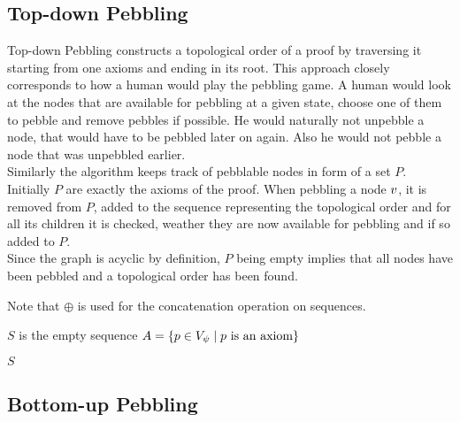 \documentclass{llncs}
\begin{document}
\subsection{Top-down Pebbling}

Top-down Pebbling constructs a topological order of a proof by traversing it starting from one axioms and ending in its root.
This approach closely corresponds to how a human would play the pebbling game. 
A human would look at the nodes that are available for pebbling at a given state, choose one of them to pebble and remove pebbles if possible.
He would naturally not unpebble a node, that would have to be pebbled later on again. Also he would not pebble a node that was unpebbled earlier.\\
Similarly the algorithm keeps track of pebblable nodes in form of a set $P$. Initially $P$ are exactly the axioms of the proof. 
When pebbling a node $v$, it is removed from $P$, added to the sequence representing the topological order and for all its children it is checked, weather they are now available for pebbling and if so added to $P$.\\
Since the graph is acyclic by definition, $P$ being empty implies that all nodes have been pebbled and a topological order has been found.

Note that $\oplus$ is used for the concatenation operation on sequences. %

\begin{algorithm}[h]
	
	$S$ is the empty sequence\;
	$A = \{p \in V_{\psi} \mid p \text{ is an axiom}\}$\;
	
	
	\Return $S$\;
	
  \caption[.]{}
  \label{algo:TDpebbling}
\end{algorithm}

\subsection{Bottom-up Pebbling}
\end{document}

